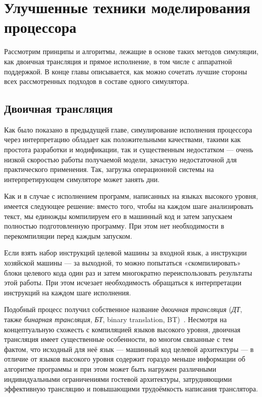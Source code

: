 \chapter{Улучшенные техники моделирования процессора}\label{bt}



Рассмотрим принципы и алгоритмы, лежащие в основе таких методов симуляции, как двоичная трансляция и прямое исполнение, в том числе с аппаратной поддержкой. В конце главы описывается, как можно сочетать лучшие стороны всех рассмотренных подходов в составе одного симулятора.

\section{Двоичная трансляция}

Как было показано в предыдущей главе, симулирование исполнения процессора через интерпретацию обладает как положительными качествами, такими как простота разработки и модификации, так и существенным недостатком — очень низкой скоростью работы получаемой модели, зачастую недостаточной для практического применения. Так, загрузка операционной системы на интерпретирующем симуляторе может занять дни.

Как и в случае с исполнением программ, написанных на языках высокого уровня, имеется следующее решение: вместо того, чтобы на каждом шаге анализировать текст, мы единожды компилируем его в машинный код и затем запускаем полностью подготовленную программу. При этом нет необходимости в перекомпиляции перед каждым запуском.

Если взять набор инструкций целевой машины за входной язык, а инструкции хозяйской машины — за выходной, то можно попытаться «скомпилировать» блоки целевого кода один раз и затем многократно переиспользовать результаты этой работы. При этом исчезает необходимость обращаться к интерпретации инструкций на каждом шаге исполнения.

Подобный процесс получил собственное название \textit{двоичная трансляция} (\textit{ДТ}, также \textit{бинарная трансляция}, \textit{БТ}, \abbr binary translation, BT)~\cite{bt1993}. Несмотря на концептуальную схожесть с компиляцией языков высокого уровня, двоичная трансляция имеет существенные особенности, во многом связанные с тем фактом, что исходный для неё язык — машинный код целевой архитектуры — в отличие от языков высокого уровня содержит гораздо меньше информации об алгоритме программы и при этом может быть нагружен различными индивидуальными ограничениями гостевой архитектуры, затрудняющими эффективную трансляцию и повышающими трудоёмкость написания транслятора.

